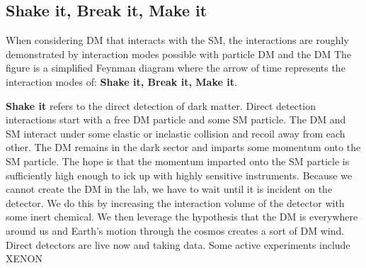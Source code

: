 \subsection{Shake it, Break it, Make it\label{sec:bop_it}}

\begin{figure}[h]
    \label{fig:break_it}
\end{figure}


When considering DM that interacts with the SM, the interactions are roughly demonstrated by interaction modes possible with particle DM and the DM
The figure is a simplified Feynman diagram where the arrow of time represents the interaction modes of: \textbf{Shake it, Break it, Make it}.

\textbf{Shake it} refers to the direct detection of dark matter.
Direct detection interactions start with a free DM particle and some SM particle.
The DM and SM interact under some elastic or inelastic collision and recoil away from each other.
The DM remains in the dark sector and imparts some momentum onto the SM particle.
The hope is that the momentum imparted onto the SM particle is sufficiently high enough to ick up with highly sensitive instruments.
Because we cannot create the DM in the lab, we have to wait until it is incident on the detector.
We do this by increasing the interaction volume of the detector with some inert chemical.
We then leverage the hypothesis that the DM is everywhere around us and Earth's motion through the cosmos creates a sort of DM wind.
Direct detectors are live now and taking data.
Some active experiments include XENON 

